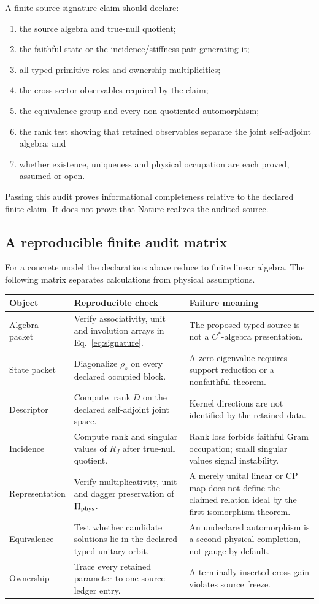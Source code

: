 \documentclass[11pt]{article}
\begin{document}
A finite source-signature claim should declare:
\begin{enumerate}[label=(S\arabic*)]
 \item the source algebra and true-null quotient;
 \item the faithful state or the incidence/stiffness pair generating it;
 \item all typed primitive roles and ownership multiplicities;
 \item the cross-sector observables required by the claim;
 \item the equivalence group and every non-quotiented automorphism;
 \item the rank test showing that retained observables separate the joint
 self-adjoint algebra; and
 \item whether existence, uniqueness and physical occupation are each proved,
 assumed or open.
\end{enumerate}

Passing this audit proves informational completeness relative to the declared
finite claim.  It does not prove that Nature realizes the audited source.

\subsection{A reproducible finite audit matrix}

For a concrete model the declarations above reduce to finite linear algebra.
The following matrix separates calculations from physical assumptions.
\begin{longtable}{p{.27\linewidth}p{.32\linewidth}p{.31\linewidth}}
\toprule
Object & Reproducible check & Failure meaning\\
\midrule
Algebra packet & Verify associativity, unit and involution arrays in
Eq.~\eqref{eq:signature}. & The proposed typed source is not a
\(C^*\)-algebra presentation.\\
State packet & Diagonalize \(\rho_s\) on every declared occupied block. & A
zero eigenvalue requires support reduction or a nonfaithful theorem.\\
Descriptor & Compute \(\operatorname{rank}D\) on the declared self-adjoint
joint space. & Kernel directions are not identified by the retained data.\\
Incidence & Compute rank and singular values of \(R_J\) after true-null
quotient. & Rank loss forbids faithful Gram occupation; small singular values
signal instability.\\
Representation & Verify multiplicativity, unit and dagger preservation of
\(\Pi_{\rm phys}\). & A merely unital linear or CP map does not define the
claimed relation ideal by the first isomorphism theorem.\\
Equivalence & Test whether candidate solutions lie in the declared typed
unitary orbit. & An undeclared automorphism is a second physical completion,
not gauge by default.\\
Ownership & Trace every retained parameter to one source ledger entry. & A
terminally inserted cross-gain violates source freeze.\\
\bottomrule
\end{longtable}
\end{document}
